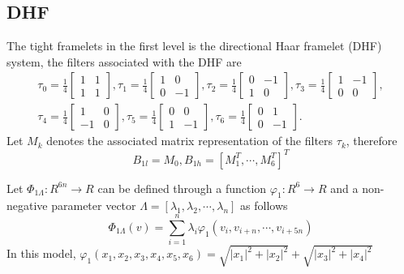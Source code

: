 \documentclass[UTF8]{article}
\begin{document}
\subsection{DHF}
\par The tight framelets in the first level is the directional Haar framelet (DHF) system, the filters associated with the DHF are
\begin{align*}
	\tau_0 = \frac{1}{4}\begin{bmatrix}
		1 & 1\\
		1 & 1
	\end{bmatrix},
	\tau_1 = \frac{1}{4}\begin{bmatrix}
		1 & 0\\
		0 & -1
	\end{bmatrix},
	\tau_2 = \frac{1}{4}\begin{bmatrix}
		0 & -1\\
		1 & 0
	\end{bmatrix},
	\tau_3 = \frac{1}{4}\begin{bmatrix}
		1 & -1\\
		0 & 0
	\end{bmatrix},\\
	\tau_4 = \frac{1}{4}\begin{bmatrix}
		1 & 0\\
		-1 & 0
	\end{bmatrix},
	\tau_5 = \frac{1}{4}\begin{bmatrix}
		0 & 0\\
		1 & -1
	\end{bmatrix},
	\tau_6 = \frac{1}{4}\begin{bmatrix}
		0 & 1\\
		0 & -1
	\end{bmatrix}.
\end{align*}
Let $M_k$ denotes the associated matrix representation of the filters $\tau_k$, therefore
\begin{equation*}
	B_{1l} = M_0 , B_{1h} = [M_1^T,\cdots, M_6^T]^T
\end{equation*}
\par Let $\Phi_{1 \Lambda} : R^{6n} \rightarrow R$ can be defined through a function $\varphi_1:R^6 \rightarrow R$ and a non-negative parameter vector $\Lambda =[ \lambda_1, \lambda_2, \cdots, \lambda_n]$ as  follows
\begin{equation*}
	\Phi_{1 \Lambda}(v) = \sum_{i= 1}^{n} \lambda_i \varphi_1(v_i, v_{i+n}, \cdots, v_{i+5n})
\end{equation*}
In this model, $\varphi_1(x_1, x_2,x_3,x_4,x_5,x_6) = \sqrt{|x_1|^2+|x_2|^2}+\sqrt{|x_3|^2+|x_4|^2}$
\end{document}
